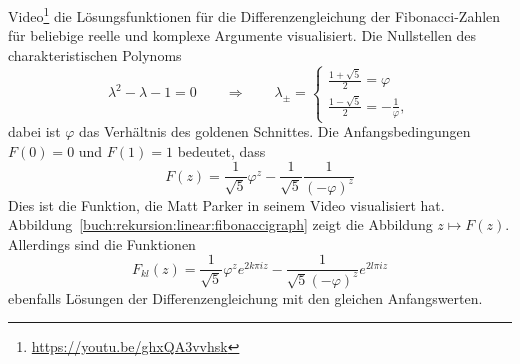 Video\footnote{\url{https://youtu.be/ghxQA3vvhsk}} die Lösungsfunktionen
für die Differenzengleichung der Fibonacci-Zahlen für beliebige
reelle und komplexe Argumente visualisiert.
Die Nullstellen des charakteristischen Polynoms
\[
\lambda^2-\lambda-1=0
\qquad
\Rightarrow
\qquad
\lambda_\pm = \begin{cases}
\displaystyle
\frac{1+\sqrt{5}}{2}=\varphi
\\[8pt]
\displaystyle
\frac{1-\sqrt{5}}{2}=-\frac{1}{\varphi},
\end{cases}
\]
dabei ist $\varphi$ das Verhältnis des goldenen Schnittes.
Die Anfangsbedingungen $F(0)=0$ und $F(1)=1$ bedeutet, dass
\begin{equation}
F(z) = \frac{1}{\sqrt{5}}\varphi^z - \frac{1}{\sqrt{5}}\frac{1}{(-\varphi)^z}
\label{buch:rekursion:linear:fibonaccifunktion}
\end{equation}
Dies ist die Funktion, die Matt Parker in seinem Video visualisiert hat.
Abbildung~\eqref{buch:rekursion:linear:fibonaccigraph} zeigt die Abbildung
$z\mapsto F(z)$.
Allerdings sind die Funktionen
\[
F_{kl}(z)
=
\frac{1}{\sqrt{5}}
\varphi^ze^{2k\pi iz}
-
\frac{1}{\sqrt{5}(-\varphi)^z} e^{2l\pi iz}
\]
ebenfalls Lösungen der Differenzengleichung mit den gleichen 
Anfangswerten.



